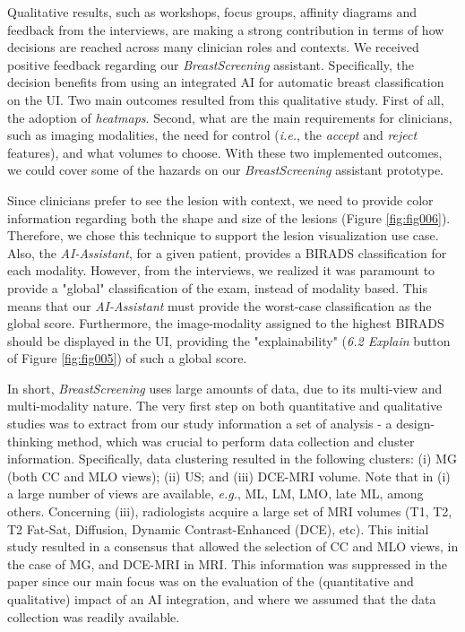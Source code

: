 Qualitative results, such as workshops, focus groups, affinity diagrams and feedback from the interviews, are making a strong contribution in terms of how decisions are rea\-ched across many clinician roles and contexts.
We received positive feedback regarding our {\it BreastScreening} assistant.
Specifically, the decision benefits from using an integrated AI for automatic breast classification on the UI.
Two main outcomes resulted from this qualitative study.
First of all, the adoption of {\it heatmaps}.
Second, what are the main requirements for clinicians, such as imaging modalities, the need for control ({\it i.e.}, the {\it accept} and {\it reject} features), and what volumes to choose.
With these two implemented outcomes, we could cover some of the hazards on our {\it Breast\-Screening} assistant prototype.

Since clinicians prefer to see the lesion with context, we need to provide color information regarding both the shape and size of the lesions (Figure \ref{fig:fig006}).
Therefore, we chose this technique to support the lesion visualization use case.
Also, the {\it AI-Assistant}, for a given patient, provides a BIRADS classification for each modality.
However, from the interviews, we realized it was paramount to provide a "global" classification of the exam, instead of modality based.
This means that our {\it AI-Assistant} must provide the worst-case classification as the global score.
Furthermore, the image-modality assigned to the highest BIRADS should be displayed in the UI, providing the "explainability" ({\it 6.2 Explain} button of Figure \ref{fig:fig005}) of such a global score.

In short, {\it BreastScreening} uses large amounts of data, due to its multi-view and multi-modality nature.
The very first step on both quantitative and qualitative studies was to extract from our study information a set of analysis - a design-thinking method, which was crucial to perform data collection and cluster information.
Specifically, data clustering resulted in the following clusters:
(i) MG (both CC and MLO views);
(ii) US; and
(iii) DCE-MRI volume.
Note that in (i) a large number of views are available, {\it e.g.}, ML, LM, LMO, late ML, among others.
Concerning (iii), radiologists acquire a large set of MRI volumes (T1, T2, T2 Fat-Sat, Diffusion, Dynamic Contrast-Enhanced (DCE), etc).
This initial study resulted in a consensus that allowed the selection of CC and MLO views, in the case of MG, and DCE-MRI in MRI.
This information was suppressed in the paper since our main focus was on the evaluation of the (quantitative and qualitative) impact of an AI integration, and where we assumed that the data collection was readily available.